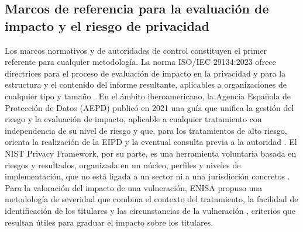 {\raggedright{}\par}


\subsection{Marcos de referencia para la evaluación de impacto y el riesgo de privacidad}

Los marcos normativos y de autoridades de control constituyen el primer referente para cualquier metodología. La norma ISO/IEC 29134:2023 ofrece directrices para el proceso de evaluación de impacto en la privacidad y para la estructura y el contenido del informe resultante, aplicables a organizaciones de cualquier tipo y tamaño \cite{iso29134_2023}. En el ámbito iberoamericano, la Agencia Española de Protección de Datos (AEPD) publicó en 2021 una guía que unifica la gestión del riesgo y la evaluación de impacto, aplicable a cualquier tratamiento con independencia de su nivel de riesgo y que, para los tratamientos de alto riesgo, orienta la realización de la EIPD y la eventual consulta previa a la autoridad \cite{aepd2021riesgo}. El NIST Privacy Framework, por su parte, es una herramienta voluntaria basada en riesgos y resultados, organizada en un núcleo, perfiles y niveles de implementación, que no está ligada a un sector ni a una jurisdicción concretos \cite{nist2020privacy}. Para la valoración del impacto de una vulneración, ENISA propuso una metodología de severidad que combina el contexto del tratamiento, la facilidad de identificación de los titulares y las circunstancias de la vulneración \cite{enisa2013severity}, criterios que resultan útiles para graduar el impacto sobre los titulares.

